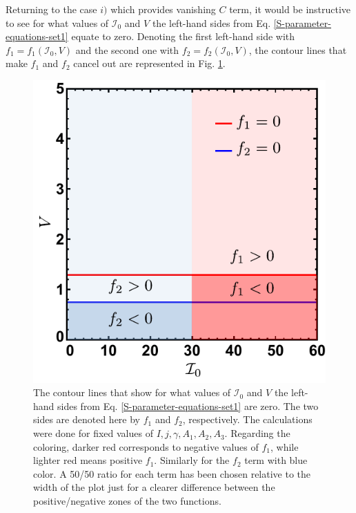 Returning to the case $i)$ which provides vanishing $C$ term, it would be instructive to see for what values of $\mathcal{I}_0$ and $V$ the left-hand sides from Eq. \ref{S-parameter-equations-set1} equate to zero. Denoting the first left-hand side with $f_1=f_1(\mathcal{I}_0,V)$ and the second one with $f_2=f_2(\mathcal{I}_0,V)$, the contour lines that make $f_1$ and $f_2$ cancel out are represented in Fig. \ref{fig-vanishing-f1-f2}.
\begin{figure}
    \centering
    \includegraphics[scale=0.8]{Chapters/Figures/f1f2_solutions-edited.pdf}
    \caption{The contour lines that show for what values of $\mathcal{I}_0$ and $V$ the left-hand sides from Eq. \ref{S-parameter-equations-set1} are zero. The two sides are denoted here by $f_1$ and $f_2$, respectively. The calculations were done for fixed values of $I, j, \gamma, A_1, A_2, A_3$. Regarding the coloring, darker red corresponds to negative values of $f_1$, while lighter red means positive $f_1$. Similarly for the $f_2$ term with blue color. A 50/50 ratio for each term has been chosen relative to the width of the plot just for a clearer difference between the positive/negative zones of the two functions.}
    \label{fig-vanishing-f1-f2}
\end{figure}

